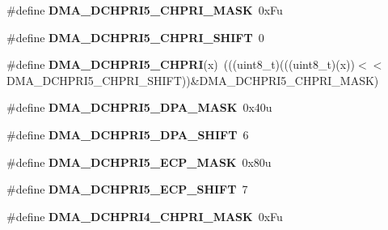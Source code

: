 \begin{DoxyCompactItemize}
\item 
\#define {\bfseries D\+M\+A\+\_\+\+D\+C\+H\+P\+R\+I5\+\_\+\+C\+H\+P\+R\+I\+\_\+\+M\+A\+SK}~0x\+Fu\hypertarget{group__DMA__Register__Masks_ga4f7ea16f3982b598833ea289b6af08e1}{}\label{group__DMA__Register__Masks_ga4f7ea16f3982b598833ea289b6af08e1}

\item 
\#define {\bfseries D\+M\+A\+\_\+\+D\+C\+H\+P\+R\+I5\+\_\+\+C\+H\+P\+R\+I\+\_\+\+S\+H\+I\+FT}~0\hypertarget{group__DMA__Register__Masks_gad92d72515f8f70aeaa7035139b95021e}{}\label{group__DMA__Register__Masks_gad92d72515f8f70aeaa7035139b95021e}

\item 
\#define {\bfseries D\+M\+A\+\_\+\+D\+C\+H\+P\+R\+I5\+\_\+\+C\+H\+P\+RI}(x)~(((uint8\+\_\+t)(((uint8\+\_\+t)(x))$<$$<$D\+M\+A\+\_\+\+D\+C\+H\+P\+R\+I5\+\_\+\+C\+H\+P\+R\+I\+\_\+\+S\+H\+I\+FT))\&D\+M\+A\+\_\+\+D\+C\+H\+P\+R\+I5\+\_\+\+C\+H\+P\+R\+I\+\_\+\+M\+A\+SK)\hypertarget{group__DMA__Register__Masks_ga66cfbbc9f5e4f86305937b1fffdc77df}{}\label{group__DMA__Register__Masks_ga66cfbbc9f5e4f86305937b1fffdc77df}

\item 
\#define {\bfseries D\+M\+A\+\_\+\+D\+C\+H\+P\+R\+I5\+\_\+\+D\+P\+A\+\_\+\+M\+A\+SK}~0x40u\hypertarget{group__DMA__Register__Masks_ga7b37f0484175d7e23fd9827d59487a9b}{}\label{group__DMA__Register__Masks_ga7b37f0484175d7e23fd9827d59487a9b}

\item 
\#define {\bfseries D\+M\+A\+\_\+\+D\+C\+H\+P\+R\+I5\+\_\+\+D\+P\+A\+\_\+\+S\+H\+I\+FT}~6\hypertarget{group__DMA__Register__Masks_ga7b735d044c9d0e93aeed7f848065dabd}{}\label{group__DMA__Register__Masks_ga7b735d044c9d0e93aeed7f848065dabd}

\item 
\#define {\bfseries D\+M\+A\+\_\+\+D\+C\+H\+P\+R\+I5\+\_\+\+E\+C\+P\+\_\+\+M\+A\+SK}~0x80u\hypertarget{group__DMA__Register__Masks_ga8d8a7a23ba67b0dd3830251a3ce561d3}{}\label{group__DMA__Register__Masks_ga8d8a7a23ba67b0dd3830251a3ce561d3}

\item 
\#define {\bfseries D\+M\+A\+\_\+\+D\+C\+H\+P\+R\+I5\+\_\+\+E\+C\+P\+\_\+\+S\+H\+I\+FT}~7\hypertarget{group__DMA__Register__Masks_ga3872194e99a98cdae0e7378a3570774c}{}\label{group__DMA__Register__Masks_ga3872194e99a98cdae0e7378a3570774c}

\item 
\#define {\bfseries D\+M\+A\+\_\+\+D\+C\+H\+P\+R\+I4\+\_\+\+C\+H\+P\+R\+I\+\_\+\+M\+A\+SK}~0x\+Fu\hypertarget{group__DMA__Register__Masks_ga87796e0046313ec4aaf1b839a5e60dcf}{}\label{group__DMA__Register__Masks_ga87796e0046313ec4aaf1b839a5e60dcf}


\end{DoxyCompactItemize}

